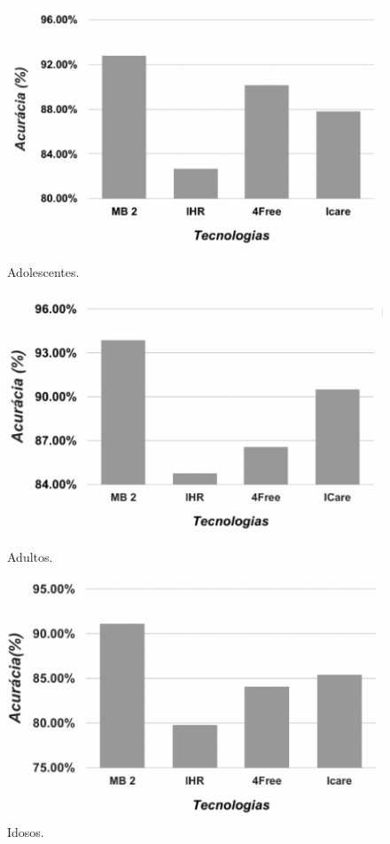 \documentclass[12pt]{article}
\begin{document}
\begin{figure}[H]

  \includegraphics[width=\linewidth]{Grafico1}
  \caption{Adolescentes.}\label{fig:awesome_image1}
\endminipage\hfill
{}
  \includegraphics[width=\linewidth]{Grafico2}
  \caption{Adultos.}\label{fig:awesome_image2}
\endminipage\hfill
{}%
  \includegraphics[width=\linewidth]{Grafico3}
  \caption{Idosos.}\label{fig:awesome_image3}
\endminipage

\end{figure}
\end{document}
